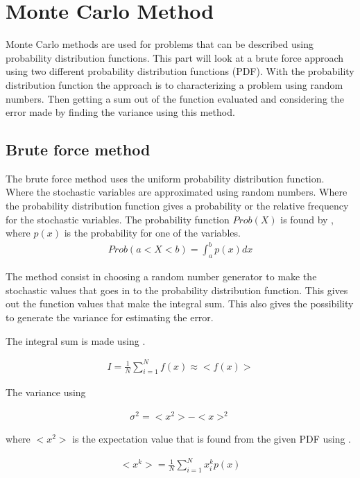 \section{Monte Carlo Method}


Monte Carlo methods are used for problems that can be described using probability distribution functions. This part will look at a brute force approach using two different probability distribution functions (PDF). With the probability distribution function the approach is to characterizing a problem using random numbers. Then getting a sum out of the function evaluated and considering the error made by finding the variance using this method.  

\subsection{Brute force method}
The brute force method uses the uniform probability distribution function. Where the stochastic variables are approximated using random numbers. Where the probability distribution function gives a probability or the relative frequency for the stochastic variables. The probability function $Prob(X)$ is found by , where $p(x)$ is the probability for one of the variables.
\begin{align}
Prob(a < X <b) = \int_a^b p(x) dx
\label{eq:probfunc}
\end{align}

The method consist in choosing a random number generator to make the stochastic values that goes in to the probability distribution function. This gives out the function values that make the integral sum. This also gives the possibility to generate the variance for estimating the error. 

The integral sum is made using . 

\begin{align}
I = \frac{1}{N}\sum_{i=1}^{N} f(x) \approx <f(x)>
\label{eq:integralBF}
\end{align}
 
The variance using 

\begin{align}
\sigma^2 = <x^2> - <x>^2
\label{eq:varianceBF} 
\end{align}

where $<x^2>$ is the expectation value that is found from the given PDF using . 

\begin{align}
<x^k> = \frac{1}{N}\sum_{i=1}^N x_i^k p(x)
\label{eq:expvalue}
\end{align} 

